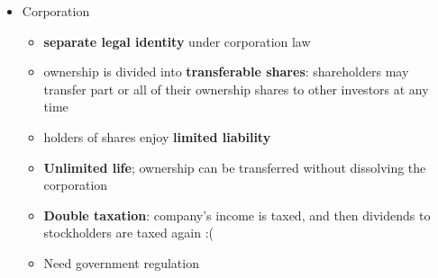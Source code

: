 \documentclass{article}
\begin{document}
\begin{multicols}{2}
\begin{itemize}
\begin{itemize}
\begin{itemize}
		\end{itemize}
		\item Corporation
		\begin{itemize}
			\item \textbf{separate legal identity} under corporation law
			\item ownership is divided into \textbf{transferable shares}: shareholders may transfer part or all of their ownership shares to other investors at any time
			\item holders of shares enjoy \textbf{limited liability}
			\item \textbf{Unlimited life}; ownership can be transferred without dissolving the corporation
			\item \textbf{Double taxation}: company's income is taxed, and then dividends to stockholders are taxed again :(
			\item Need government regulation
		\end{itemize}
	\end{itemize}
\end{itemize}


\end{multicols}
\end{document}
